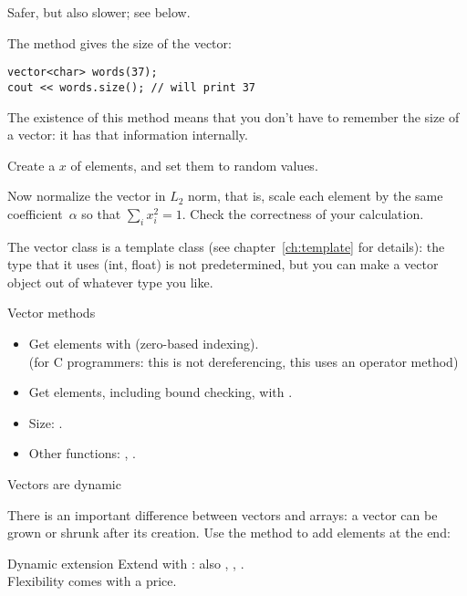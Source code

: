 Safer, but also slower; see below.

The method  gives the size of the vector:
\begin{verbatim}
vector<char> words(37);
cout << words.size(); // will print 37
\end{verbatim}
The existence of this method means that you don't have to remember the
size of a vector: it has that information internally.

\begin{exercise}
  \label{ex:vectornormalize}
  Create a  $x$ of  elements, and set them to random
  values.

  Now normalize the vector in $L_2$ norm, that is, scale each element
  by the same coefficient~$\alpha$ so that $\sum_i x_i^2=1$. Check the
  correctness of your calculation.
\end{exercise}

\begin{advanced}
  The vector class is a template class (see chapter~\ref{ch:template}
  for details): the type that it uses (int,
  float) is not predetermined, but you can make a vector object out of
  whatever type you like.
\end{advanced}

\begin{slide}{Vector methods}
  \label{sl:vector-method}
  \begin{itemize}
  \item Get elements with  (zero-based indexing).\\
    (for C programmers: this is not dereferencing, this uses an
    operator method)
  \item Get elements, including bound checking, with .
  \item Size: .
  \item Other functions: , .
  \end{itemize}
\end{slide}

 {Vectors are dynamic}
\label{sec:stdvector-dynamic}

There is an important difference between vectors and arrays: a vector
can be grown or shrunk after its creation.
Use the  method to add elements at the end:

\begin{block}{Dynamic extension}
  \label{sl:vector-dynamic}
  Extend with :
  also , , .\\
  Flexibility comes with a price.
\end{block}


